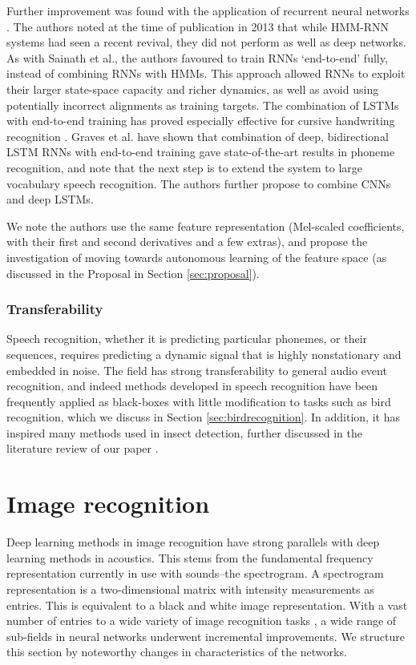\documentclass[12pt]{llncs}
\begin{document}
Further improvement was found with the application of recurrent neural networks \cite{graves2013speech}. The authors noted at the time of publication in 2013 that while HMM-RNN systems had seen a recent revival, they did not perform as well as deep networks. As with Sainath et al., the authors favoured to train RNNs ‘end-to-end’ fully, instead of combining RNNs with HMMs. This approach allowed RNNs to exploit their larger state-space capacity and richer dynamics, as well as avoid using potentially incorrect alignments as training targets. The combination of LSTMs with end-to-end training has proved especially effective for cursive handwriting recognition \cite{graves2008unconstrained,graves2009offline}. Graves et al. \cite{graves2013speech} have shown that combination of deep, bidirectional LSTM RNNs with end-to-end training gave state-of-the-art results in phoneme recognition, and note that the next step is to extend the system to large vocabulary speech recognition. The authors further propose to combine CNNs and deep LSTMs. 

We note the authors use the same feature representation (Mel-scaled coefficients, with their first and second derivatives and a few extras), and propose the investigation of moving towards autonomous learning of the feature space (as discussed in the Proposal in Section \ref{sec:proposal}).
\subsubsection{Transferability}
Speech recognition, whether it is predicting particular phonemes, or their sequences, requires predicting a dynamic signal that is highly nonstationary and embedded in noise. The field has strong transferability to general audio event recognition, and indeed methods developed in speech recognition have been frequently applied as black-boxes with little modification to tasks such as bird recognition, which we discuss in Section \ref{sec:birdrecognition}. In addition, it has inspired many methods used in insect detection, further discussed in the literature review of our paper \cite[Section 2.1]{kiskin2017mosquito}.


\section{Image recognition}
\label{sec:imagerecognition}
Deep learning methods in image recognition have strong parallels with deep learning methods in acoustics. This stems from the fundamental frequency representation currently in use with sounds--the spectrogram. A spectrogram representation is a two-dimensional matrix with intensity measurements as entries. This is equivalent to a black and white image representation. With a vast number of entries to a wide variety of image recognition tasks \cite{russakovsky2014imagenet,ILSVRC15}, a wide range of sub-fields in neural networks underwent incremental improvements. We structure this section by noteworthy changes in characteristics of the networks.
\end{document}
